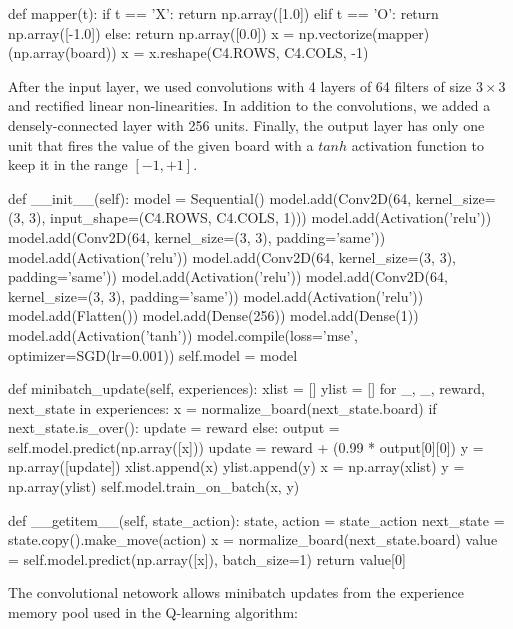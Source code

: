 \documentclass{article}
\begin{document}
\begin{python}
def mapper(t):
    if t == 'X':
        return np.array([1.0])
    elif t == 'O':
        return np.array([-1.0])
    else:
        return np.array([0.0])
x = np.vectorize(mapper)(np.array(board))
x = x.reshape(C4.ROWS, C4.COLS, -1)
\end{python}

After the input layer, we used convolutions with 4 layers of 64 filters of size $3\times3$ and
rectified linear non-linearities. In addition to the convolutions, we added a densely-connected
layer with 256 units. Finally, the output layer has only one unit that fires the value of the given
board with a $tanh$ activation function to keep it in the range $[-1, +1]$.

\begin{python}
    def __init__(self):
        model = Sequential()
        model.add(Conv2D(64, kernel_size=(3, 3), input_shape=(C4.ROWS, C4.COLS, 1)))
        model.add(Activation('relu'))
        model.add(Conv2D(64, kernel_size=(3, 3), padding='same'))
        model.add(Activation('relu'))
        model.add(Conv2D(64, kernel_size=(3, 3), padding='same'))
        model.add(Activation('relu'))
        model.add(Conv2D(64, kernel_size=(3, 3), padding='same'))
        model.add(Activation('relu'))
        model.add(Flatten())
        model.add(Dense(256))
        model.add(Dense(1))
        model.add(Activation('tanh'))
        model.compile(loss='mse', optimizer=SGD(lr=0.001))
        self.model = model

    def minibatch_update(self, experiences):
        xlist = []
        ylist = []
        for _, _, reward, next_state in experiences:
            x = normalize_board(next_state.board)
            if next_state.is_over():
                update = reward
            else:
                output = self.model.predict(np.array([x]))
                update = reward + (0.99 * output[0][0])
            y = np.array([update])
            xlist.append(x)
            ylist.append(y)
        x = np.array(xlist)
        y = np.array(ylist)
        self.model.train_on_batch(x, y)

    def __getitem__(self, state_action):
        state, action = state_action
        next_state = state.copy().make_move(action)
        x = normalize_board(next_state.board)
        value = self.model.predict(np.array([x]), batch_size=1)
        return value[0]
\end{python}

The convolutional netowork allows minibatch updates from the experience memory pool used in the
Q-learning algorithm:
\end{document}
